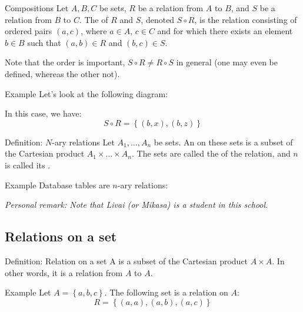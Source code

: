 \documentclass[a4paper]{article}
\begin{document}
\begin{parag}{Compositions}
    Let $A, B, C$ be sets, $R$ be a relation from $A$ to $B$, and $S$ be a relation from $B$ to $C$. The  of $R$ and $S$, denoted $S \circ R$, is the relation consisting of ordered pairs $\left(a, c\right)$, where $a \in A$, $c \in C$ and for which there exists an element $b \in B$ such that $\left(a, b\right) \in R$ and $\left(b, c\right) \in S$.

    Note that the order is important, $S \circ R \neq R \circ S$ in general (one may even be defined, whereas the other not).

    \begin{subparag}{Example}
        Let's look at the following diagram:

        In this case, we have: 
        \[S \circ R = \left\{\left(b, x\right), \left(b, z\right)\right\}\]
    \end{subparag}
    
\end{parag}

\begin{parag}{Definition: $N$-ary relations}
    Let $A_1, \ldots, A_n$ be sets. An  on these sets is a subset of the Cartesian product $A_1 \times \ldots \times A_n$. The sets are called the  of the relation, and $n$ is called its .

    \begin{subparag}{Example}
        Database tables are $n$-ary relations:

        \textit{Personal remark: Note that Livai (or Mikasa) is a student in this school.}
    \end{subparag}
    
\end{parag}

\subsection{Relations on a set}
\begin{parag}{Definition: Relation on a set}
    A  is a subset of the Cartesian product $A \times A$. In other words, it is a relation from $A$ to $A$.

    \begin{subparag}{Example}
        Let $A = \left\{a, b, c\right\}$. The following set is a relation on $A$: 
        \[R = \left\{\left(a, a\right), \left(a, b\right), \left(a, c\right)\right\}\]
    \end{subparag}
\end{parag}
\end{document}
